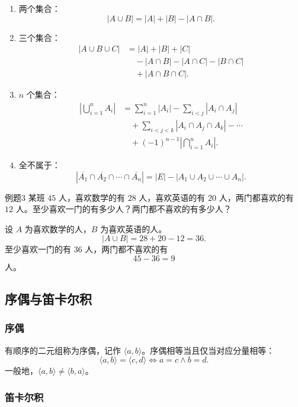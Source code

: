 \begin{enumerate}
	\item 两个集合：
	\[
	|A\cup B|=|A|+|B|-|A\cap B|.
	\]
	\item 三个集合：
	\[
	\begin{aligned}
	|A\cup B\cup C|
	&=|A|+|B|+|C|\\
	&\quad-|A\cap B|-|A\cap C|-|B\cap C|\\
	&\quad+|A\cap B\cap C|.
	\end{aligned}
	\]
	\item \(n\) 个集合：
	\[
	\begin{aligned}
	\left|\bigcup_{i=1}^{n}A_i\right|
	&=\sum_{i=1}^{n}|A_i|
	-\sum_{i<j}|A_i\cap A_j|\\
	&\quad+\sum_{i<j<k}|A_i\cap A_j\cap A_k|
	-\cdots\\
	&\quad+(-1)^{n-1}\left|\bigcap_{i=1}^{n}A_i\right|.
	\end{aligned}
	\]
	\item 全不属于：
	\[
	\left|\overline{A_1}\cap\overline{A_2}\cap\cdots\cap\overline{A_n}\right|
	=|E|-\left|A_1\cup A_2\cup\cdots\cup A_n\right|.
	\]
\end{enumerate}

\begin{question}{例题3}
	某班 \(45\) 人，喜欢数学的有 \(28\) 人，喜欢英语的有 \(20\) 人，两门都喜欢的有 \(12\) 人。至少喜欢一门的有多少人？两门都不喜欢的有多少人？
	
	\begin{solution}
	设 \(A\) 为喜欢数学的人，\(B\) 为喜欢英语的人。
	\[
	|A\cup B|=28+20-12=36.
	\]
	至少喜欢一门的有 \(36\) 人，两门都不喜欢的有
	\[
	45-36=9
	\]
	人。
	\end{solution}
\end{question}

\subsection{序偶与笛卡尔积}

\subsubsection{序偶}

有顺序的二元组称为序偶，记作 \(\langle a,b\rangle\)。序偶相等当且仅当对应分量相等：
\[
\langle a,b\rangle=\langle c,d\rangle\Leftrightarrow a=c\land b=d.
\]
一般地，\(\langle a,b\rangle\ne\langle b,a\rangle\)。

\subsubsection{笛卡尔积}

